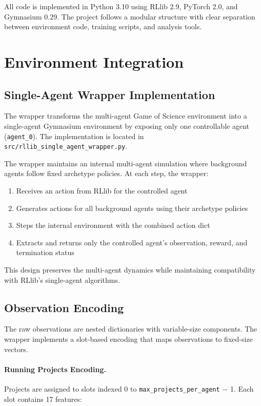 \documentclass[english,bachelor]{hsluthesis}
\begin{document}
All code is implemented in Python 3.10 using RLlib 2.9, PyTorch 2.0, and Gymnasium 0.29. The project follows a modular structure with clear separation between environment code, training scripts, and analysis tools.

\section{Environment Integration}

\subsection{Single-Agent Wrapper Implementation}

The wrapper transforms the multi-agent Game of Science environment into a single-agent Gymnasium environment by exposing only one controllable agent (\texttt{agent\_0}). The implementation is located in \texttt{src/rllib\_single\_agent\_wrapper.py}.

The wrapper maintains an internal multi-agent simulation where background agents follow fixed archetype policies. At each step, the wrapper:

\begin{enumerate}
    \item Receives an action from RLlib for the controlled agent
    \item Generates actions for all background agents using their archetype policies
    \item Steps the internal environment with the combined action dict
    \item Extracts and returns only the controlled agent's observation, reward, and termination status
\end{enumerate}

This design preserves the multi-agent dynamics while maintaining compatibility with RLlib's single-agent algorithms.

\subsection{Observation Encoding}

The raw observations are nested dictionaries with variable-size components. The wrapper implements a slot-based encoding that maps observations to fixed-size vectors.

\paragraph{Running Projects Encoding.}
Projects are assigned to slots indexed 0 to \texttt{max\_projects\_per\_agent} $-$ 1. Each slot contains 17 features:
\end{document}
